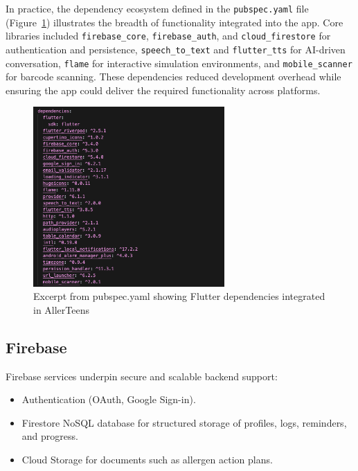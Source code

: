 \documentclass[MScCS]{uccthesis}
\begin{document}
In practice, the dependency ecosystem defined in the \texttt{pubspec.yaml} file (Figure~\ref{fig:pubspec}) illustrates the breadth of functionality integrated into the app. Core libraries included \texttt{firebase\_core}, \texttt{firebase\_auth}, and \texttt{cloud\_firestore} for authentication and persistence, \texttt{speech\_to\_text} and \texttt{flutter\_tts} for AI-driven conversation, \texttt{flame} for interactive simulation environments, and \texttt{mobile\_scanner} for barcode scanning. These dependencies reduced development overhead while ensuring the app could deliver the required functionality across platforms.

\begin{figure}[htbp]
    \centering
    \includegraphics[width=0.65\textwidth,height=0.45\textheight,keepaspectratio]{Figures/pubspec_yaml.png}
    \caption{Excerpt from pubspec.yaml showing Flutter dependencies integrated in AllerTeens}
    \label{fig:pubspec}
\end{figure}


\subsection{Firebase}
Firebase services underpin secure and scalable backend support:
\begin{itemize}
    \item Authentication (OAuth, Google Sign-in).
    \item Firestore NoSQL database for structured storage of profiles, logs, reminders, and progress.
    \item Cloud Storage for documents such as allergen action plans.
\end{itemize}
\end{document}
